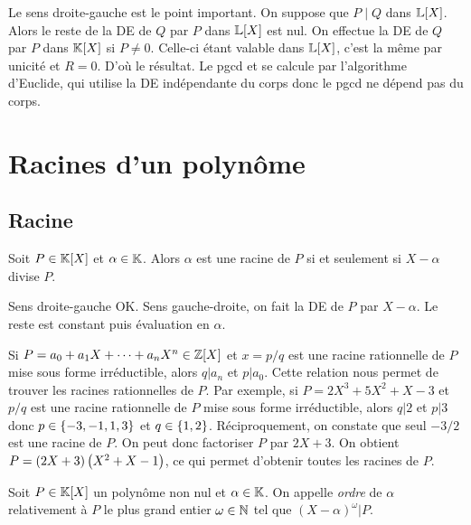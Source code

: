 \documentclass{magnolia}
\begin{document}
\begin{preuve}
Le sens droite-gauche est le point important. On suppose que $P\mid Q$ dans $\polyL$. Alors le reste de la DE de $Q$ par $P$ dans $\polyL$ est nul. On effectue la DE de $Q$ par $P$ dans $\polyK$ si $P\neq 0$. Celle-ci étant valable dans $\polyL$, c'est la même par unicité et $R=0$. D'où le résultat.
Le pgcd et se calcule par l'algorithme d'Euclide, qui utilise la DE indépendante du corps donc le pgcd ne dépend pas du corps.
\end{preuve}


\section{Racines d'un polynôme}

\subsection{Racine}


\begin{proposition}
Soit $P\in\polyK$ et $\alpha\in\mathbb{K}$. Alors $\alpha$ est une racine de $P$ si et
seulement si $X-\alpha$ divise $P$.
\end{proposition}

\begin{preuve}
Sens droite-gauche OK.
Sens gauche-droite, on fait la DE de $P$ par $X-\alpha$. Le reste est constant puis évaluation en $\alpha$.
\end{preuve}

\begin{remarqueUnique}
\remarque Si $P=a_0+a_1X+\cdots+a_n X^n\in\polyZ$ et $x=p/q$ est une racine
  rationnelle
  de $P$ mise sous forme irréductible, alors $q|a_n$ et $p|a_0$. Cette relation
  nous permet de trouver les racines rationnelles de
  $P$. Par exemple, si $P=2X^3+5X^2+X-3$ et $p/q$ est une racine rationnelle
  de $P$ mise sous forme irréductible, alors $q|2$ et $p|3$ donc
  $p\in\left\{-3,-1,1,3\right\}$ et $q\in\left\{1,2\right\}$. Réciproquement, on constate
  que seul $-3/2$ est une racine de $P$. On peut donc factoriser $P$ par $2X+3$.
  On obtient $P=\left(2X+3\right)\left(X^2+X-1\right)$, ce qui permet d'obtenir toutes les
  racines de $P$.
\end{remarqueUnique}


\begin{definition}
Soit $P\in\polyK$ un polynôme non nul et $\alpha\in\mathbb{K}$. On appelle \emph{ordre} de $\alpha$ relativement à $P$
le plus grand entier $\omega\in\mathbb{N}$ tel que $(X-\alpha)^\omega|P$.
\end{definition}
\end{document}
